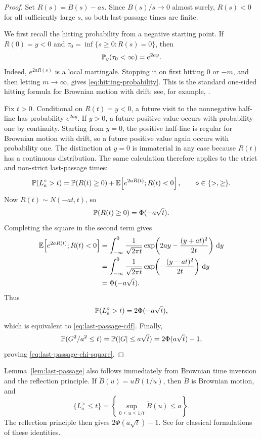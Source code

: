\begin{proof}
Set $R(s)=B(s)-as$.  Since $B(s)/s\to0$ almost surely, $R(s)<0$ for all
sufficiently large $s$, so both last-passage times are finite.

We first recall the hitting probability from a negative starting point.  If
$R(0)=y<0$ and $\tau_0=\inf\{s\ge0:R(s)=0\}$, then
\begin{equation}\label{eq:hitting-probability}
  \P_y(\tau_0<\infty)=e^{2ay}.
\end{equation}
Indeed, $e^{2aR(s)}$ is a local martingale.  Stopping it on first hitting
$0$ or $-m$, and then letting $m\to\infty$, gives
\eqref{eq:hitting-probability}.  This is the standard one-sided hitting
formula for Brownian motion with drift; see, for example,
\cite[Chapter~3]{KaratzasShreve1991}.

Fix $t>0$.  Conditional on $R(t)=y<0$, a future visit to the nonnegative
half-line has probability $e^{2ay}$.  If $y>0$, a future positive value occurs
with probability one by continuity.  Starting from $y=0$, the positive
half-line is regular for Brownian motion with drift, so a future positive value
again occurs with probability one.  The distinction at $y=0$ is immaterial in
any case because $R(t)$ has a continuous distribution.  The same calculation
therefore applies to the strict and non-strict last-passage times:
\begin{equation}\label{eq:last-passage-tail-decomp}
  \P(L_a^{\diamond}>t)
  =\P(R(t)\ge0)
   +\E\!\left[e^{2aR(t)};R(t)<0\right],
  \qquad \diamond\in\{>,\ge\}.
\end{equation}
Now $R(t)\sim N(-at,t)$, so
\begin{equation}\label{eq:first-half-tail}
  \P(R(t)\ge0)=\Phi(-a\sqrt t).
\end{equation}
Completing the square in the second term gives
\begin{align}
  \E\!\left[e^{2aR(t)};R(t)<0\right]
  & =\int_{-\infty}^{0}
  \frac{1}{\sqrt{2\pi t}}
  \exp\!\left(2ay-\frac{(y+at)^2}{2t}\right)\dd y\notag\\
  & =\int_{-\infty}^{0}
  \frac{1}{\sqrt{2\pi t}}
  \exp\!\left(-\frac{(y-at)^2}{2t}\right)\dd y\notag\\
  & =\Phi(-a\sqrt t).
  \label{eq:second-half-tail}
\end{align}
Thus
\begin{equation}\label{eq:last-passage-tail}
  \P(L_a^{\diamond}>t)=2\Phi(-a\sqrt t),
\end{equation}
which is equivalent to \eqref{eq:last-passage-cdf}.  Finally,
\[
  \P(G^2/a^2\le t)=\P(|G|\le a\sqrt t)=2\Phi(a\sqrt t)-1,
\]
proving \eqref{eq:last-passage-chi-square}.
\end{proof}

\begin{remark}\label{rem:time-inversion}
Lemma~\ref{lem:last-passage} also follows immediately from Brownian time
inversion and the reflection principle.  If
$\widetilde B(u)=uB(1/u)$, then $\widetilde B$ is Brownian motion, and
\[
 \{L_a^{>}\le t\}
 =\left\{\sup_{0\le u\le1/t}\widetilde B(u)\le a\right\}.
\]
The reflection principle then gives
$2\Phi(a\sqrt t)-1$.  See \cite{RevuzYor1999,BorodinSalminen2002} for
classical formulations of these identities.
\end{remark}
